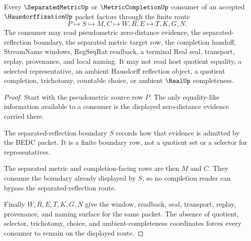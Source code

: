 \begin{theorem}
\label{thm:hausdorffization-separated-reflection}
Every $\SeparatedMetricUp$ or $\MetricCompletionUp$ consumer of an accepted $\HausdorffizationUp$ packet factors through the finite route
$$
P \longmapsto S \longmapsto M,C \longmapsto W,R,E \longmapsto T,K,G,N .
$$
The consumer may read pseudometric zero-distance evidence, the separated-reflection boundary, the separated metric target row, the completion handoff, StreamName windows, RegSeqRat readback, a terminal Real seal, transport, replay, provenance, and local naming. It may not read host quotient equality, a selected representative, an ambient Hausdorff reflection object, a quotient completion, trichotomy, countable choice, or ambient $\RealUp$ completeness.
\end{theorem}
\begin{proof}
Start with the pseudometric source row $P$. The only equality-like information available to a consumer is the displayed zero-distance evidence carried there.

The separated-reflection boundary $S$ records how that evidence is admitted by the BEDC packet. It is a finite boundary row, not a quotient set or a selector for representatives.

The separated metric and completion-facing rows are then $M$ and $C$. They consume the boundary already displayed by $S$, so no completion reader can bypass the separated-reflection route.

Finally $W,R,E,T,K,G,N$ give the window, readback, seal, transport, replay, provenance, and naming surface for the same packet. The absence of quotient, selector, trichotomy, choice, and ambient-completeness coordinates forces every consumer to remain on the displayed route.
\end{proof}

